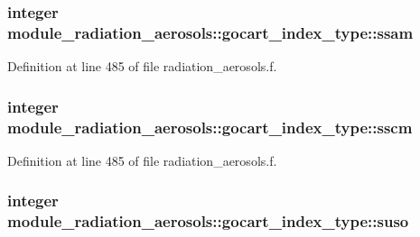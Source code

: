 \subsubsection[{\texorpdfstring{ssam}{ssam}}]{\setlength{\rightskip}{0pt plus 5cm}integer module\+\_\+radiation\+\_\+aerosols\+::gocart\+\_\+index\+\_\+type\+::ssam\hspace{0.3cm}{\ttfamily [private]}}\hypertarget{structmodule__radiation__aerosols_1_1gocart__index__type_a911c3dc2e5722a38166950003a4d0875}{}\label{structmodule__radiation__aerosols_1_1gocart__index__type_a911c3dc2e5722a38166950003a4d0875}


Definition at line 485 of file radiation\+\_\+aerosols.\+f.

\subsubsection[{\texorpdfstring{sscm}{sscm}}]{\setlength{\rightskip}{0pt plus 5cm}integer module\+\_\+radiation\+\_\+aerosols\+::gocart\+\_\+index\+\_\+type\+::sscm\hspace{0.3cm}{\ttfamily [private]}}\hypertarget{structmodule__radiation__aerosols_1_1gocart__index__type_a814b63e33cdf9c3e1e470406056a9fcb}{}\label{structmodule__radiation__aerosols_1_1gocart__index__type_a814b63e33cdf9c3e1e470406056a9fcb}


Definition at line 485 of file radiation\+\_\+aerosols.\+f.

\subsubsection[{\texorpdfstring{suso}{suso}}]{\setlength{\rightskip}{0pt plus 5cm}integer module\+\_\+radiation\+\_\+aerosols\+::gocart\+\_\+index\+\_\+type\+::suso\hspace{0.3cm}{\ttfamily [private]}}\hypertarget{structmodule__radiation__aerosols_1_1gocart__index__type_a1556732edff9dba1d6593a1117af056f}{}\label{structmodule__radiation__aerosols_1_1gocart__index__type_a1556732edff9dba1d6593a1117af056f}


